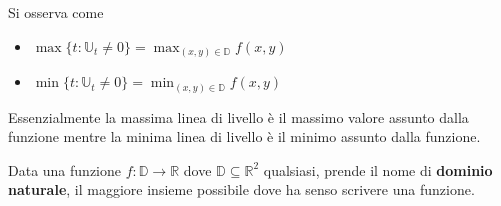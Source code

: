 \documentclass[a4paper, oneside]{book}
\begin{document}
\begin{observation}
    Si osserva come 
    \begin{itemize}
        \item $\max \{t : \mathbb{U}_t \neq 0\} = \max_{(x, y) \in \mathbb{D}} f(x, y)$
        \item $\min \{t : \mathbb{U}_t \neq 0\} = \min_{(x, y) \in \mathbb{D}} f(x, y)$ 
    \end{itemize}
    Essenzialmente la massima linea di livello è il massimo valore assunto dalla funzione mentre
    la minima linea di livello è il minimo assunto dalla funzione. 
\end{observation}
\begin{definition}
    Data una funzione $f : \mathbb{D} \to \mathbb{R}$ dove $\mathbb{D} \subseteq \mathbb{R}^{2}$
    qualsiasi, prende il nome di \textbf{dominio naturale}, il maggiore insieme possibile 
    dove ha senso scrivere una funzione.
\end{definition}
\end{document}
